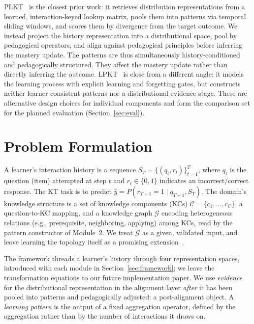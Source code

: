 \documentclass[conference]{IEEEtran}
\begin{document}
PLKT~\cite{wu2026plkt} is the closest prior work: it retrieves distribution representations from a learned, interaction-keyed lookup matrix, pools them into patterns via temporal sliding windows, and scores them by divergence from the target outcome. We instead project the history representation into a distributional space, pool by pedagogical operators, and align against pedagogical principles before inferring the mastery update. The patterns are thus simultaneously history-conditioned and pedagogically structured. They affect the mastery update rather than directly inferring the outcome. LPKT~\cite{shen2021lpkt} is close from a different angle: it models the learning process with explicit learning and forgetting gates, but constructs neither learner-consistent patterns nor a distributional evidence stage. These are alternative design choices for individual components and form the comparison set for the planned evaluation (Section~\ref{sec:eval}).

\section{Problem Formulation}
\label{sec:formulation}

A learner's interaction history is a sequence $S_T=\{(q_t,r_t)\}_{t=1}^{T}$, where $q_t$ is the question (item) attempted at step $t$ and $r_t \in \{0,1\}$ indicates an incorrect/correct response. The KT task is to predict $\hat{y}=P(r_{T+1}=1 \mid q_{T+1}, S_T)$. The domain's knowledge structure is a set of knowledge components (KCs) $\mathcal{C}=\{c_1,\dots,c_C\}$, a question-to-KC mapping, and a knowledge graph $\mathcal{G}$ encoding heterogeneous relations (e.g., prerequisite, neighboring, applying) among KCs, read by the pattern constructor of Module~2. We treat $\mathcal{G}$ as a given, validated input, and leave learning the topology itself as a promising extension~\cite{wu2026sskt}.

The framework threads a learner's history through four representation spaces, introduced with each module in Section~\ref{sec:framework}; we leave the transformation equations to our future implementation paper. We use \emph{evidence} for the distributional representation in the alignment layer \emph{after} it has been pooled into patterns and pedagogically adjusted: a post-alignment object. A \emph{learning pattern} is the output of a fixed aggregation operator, defined by the aggregation rather than by the number of interactions it draws on.
\end{document}
